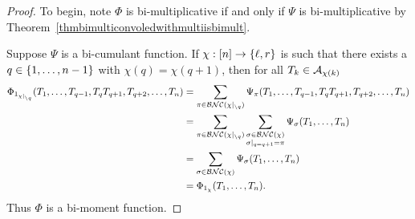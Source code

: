 		\begin{proof}
			To begin, note $\Phi$ is bi-multiplicative if and only if $\Psi$ is bi-multiplicative by Theorem~\ref{thmbimulticonvoledwithmultiisbimult}.


			Suppose $\Psi$ is a bi-cumulant function.
			If $\chi : [n] \to \left\{\ell, r\right\}$ is such that there exists a $q \in \left\{1,\ldots, n-1\right\}$ with $\chi(q) = \chi(q+1)$, then for all $T_k \in \mathcal{A}_{\chi(k)}$
			\begin{align*}
				\Phi_{1_{\chi|_{\setminus q}}}(T_1,\ldots, T_{q-1}, T_q T_{q+1}, T_{q+2}, \ldots, T_n) &= \sum_{\pi \in \mathcal{BNC}(\chi|_{\setminus q})} \Psi_{\pi}(T_1,\ldots, T_{q-1}, T_q T_{q+1}, T_{q+2}, \ldots, T_n)
				\\
				&=
				\sum_{\pi \in \mathcal{BNC}(\chi|_{\setminus q})} \sum_{\substack{\sigma \in \mathcal{BNC}(\chi) \\ \sigma|_{q = q+1} = \pi}} \Psi_{\sigma}(T_1,\ldots, T_n) \\
				&=
				\sum_{\sigma \in \mathcal{BNC}(\chi)} \Psi_{\sigma}(T_1,\ldots, T_n) \\
				&=
				\Phi_{1_\chi}(T_1,\ldots, T_n).
			\end{align*}
			Thus $\Phi$ is a bi-moment function.


\end{proof}
